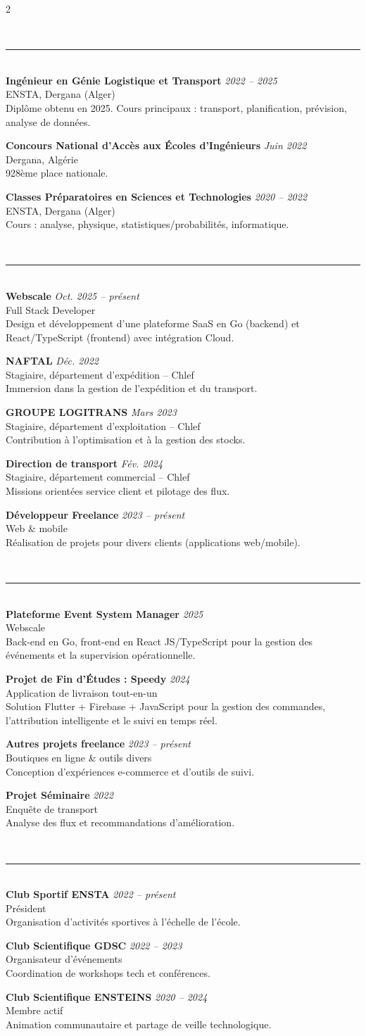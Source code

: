 \documentclass[10pt,a4paper]{article}
\newcommand{\cvsection}[1]{\vspace{0.6em}\noindent{\bfseries\textcolor{primary}{#1}}\\[-0.2em]\textcolor{primary}{\rule{\linewidth}{0.5pt}}\\[0.2em]}
\newcommand{\cventry}[4]{\textbf{#1} \hfill \textit{#2}\\\textcolor{textgray}{#3}\\#4\par}
\begin{document}
\begin{paracol}{2}
\switchcolumn

\cvsection{\'EDUCATION}
\cventry{Ing\'enieur en G\'enie Logistique et Transport}{2022 -- 2025}{ENSTA, Dergana (Alger)}{Dipl\^ome obtenu en 2025. Cours principaux : transport, planification, pr\'evision, analyse de donn\'ees.}

\cventry{Concours National d'Acc\`es aux \'Ecoles d'Ing\'enieurs}{Juin 2022}{Dergana, Alg\'erie}{928\`eme place nationale.}

\cventry{Classes Pr\'eparatoires en Sciences et Technologies}{2020 -- 2022}{ENSTA, Dergana (Alger)}{Cours : analyse, physique, statistiques/probabilit\'es, informatique.}

\cvsection{EXP\'ERIENCE}
\cventry{Webscale}{Oct. 2025 -- pr\'esent}{Full Stack Developer}{Design et d\'eveloppement d'une plateforme SaaS en Go (backend) et React/TypeScript (frontend) avec int\'egration Cloud.}

\cventry{NAFTAL}{D\'ec. 2022}{Stagiaire, d\'epartement d'exp\'edition -- Chlef}{Immersion dans la gestion de l'exp\'edition et du transport.}

\cventry{GROUPE LOGITRANS}{Mars 2023}{Stagiaire, d\'epartement d'exploitation -- Chlef}{Contribution \`a l'optimisation et \`a la gestion des stocks.}

\cventry{Direction de transport}{F\'ev. 2024}{Stagiaire, d\'epartement commercial -- Chlef}{Missions orient\'ees service client et pilotage des flux.}

\cventry{D\'eveloppeur Freelance}{2023 -- pr\'esent}{Web \& mobile}{R\'ealisation de projets pour divers clients (applications web/mobile).}

\cvsection{PROJETS}
\cventry{Plateforme Event System Manager}{2025}{Webscale}{Back-end en Go, front-end en React JS/TypeScript pour la gestion des \'ev\'enements et la supervision op\'erationnelle.}

\cventry{Projet de Fin d'\'Etudes : Speedy}{2024}{Application de livraison tout-en-un}{Solution Flutter + Firebase + JavaScript pour la gestion des commandes, l'attribution intelligente et le suivi en temps r\'eel.}

\cventry{Autres projets freelance}{2023 -- pr\'esent}{Boutiques en ligne \& outils divers}{Conception d'exp\'eriences e-commerce et d'outils de suivi.}

\cventry{Projet S\'eminaire}{2022}{Enqu\^ete de transport}{Analyse des flux et recommandations d'am\'elioration.}

\cvsection{ACTIVIT\'ES ASSOCIATIVES}
\cventry{Club Sportif ENSTA}{2022 -- pr\'esent}{Pr\'esident}{Organisation d'activit\'es sportives \`a l'\'echelle de l'\'ecole.}

\cventry{Club Scientifique GDSC}{2022 -- 2023}{Organisateur d'\'ev\'enements}{Coordination de workshops tech et conf\'erences.}

\cventry{Club Scientifique ENSTEINS}{2020 -- 2024}{Membre actif}{Animation communautaire et partage de veille technologique.}

\end{paracol}
\end{document}
